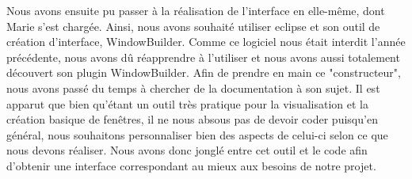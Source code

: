 Nous avons ensuite pu passer à la réalisation de l'interface en elle-même, dont Marie s'est chargée. 
Ainsi, nous avons souhaité utiliser eclipse et son outil de création d'interface, WindowBuilder. Comme ce logiciel nous était interdit l'année précédente, nous avons dû réapprendre à l'utiliser et nous avons aussi totalement découvert son plugin WindowBuilder. Afin de prendre en main ce "constructeur", nous avons passé du temps à chercher de la documentation à son sujet. Il est apparut que bien qu'étant un outil très pratique pour la visualisation et la création basique de fenêtres, il ne nous absous pas de devoir coder puisqu'en général, nous souhaitons personnaliser bien des aspects de celui-ci selon ce que nous devons réaliser. Nous avons donc jonglé entre cet outil et le code afin d'obtenir une interface correspondant au mieux aux besoins de notre projet.
